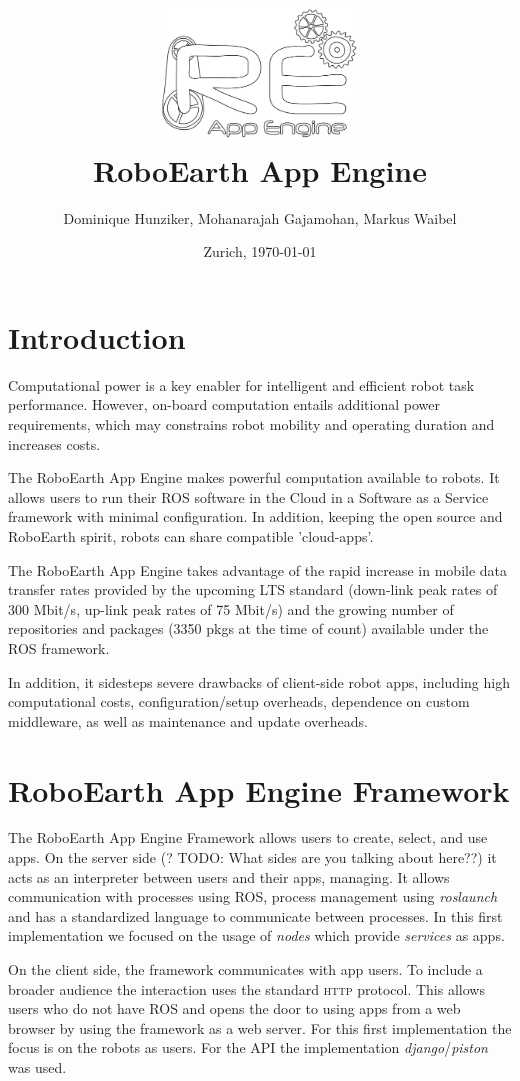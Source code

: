 \documentclass[10pt,a4paper]{article}
\title {\includegraphics[height=1.40in]{icon.pdf} \\RoboEarth App Engine }
\author {Dominique Hunziker, Mohanarajah Gajamohan, Markus Waibel}
\date{Zurich, \today}
\begin{document}
\maketitle
\section*{Introduction}

		Computational power is a key enabler for 
		intelligent and efficient robot task performance. However, on-board
		computation entails additional power requirements, which may constrains robot mobility and operating duration and increases costs.

The RoboEarth App Engine makes powerful computation available to robots. 
It allows users to run their ROS software in the Cloud in a Software as a Service framework with minimal configuration.
In addition,
		keeping the open source and RoboEarth spirit, robots can share compatible 'cloud-apps'.

The RoboEarth App Engine takes advantage of the rapid increase in mobile data transfer rates provided
		by the upcoming LTS standard (down-link peak rates of 300 Mbit/s,
		up-link peak rates of 75 Mbit/s) and the growing number of
		repositories and packages (3350 pkgs at the time of count) available
		under the ROS framework. 
				
In addition, it sidesteps severe drawbacks of client-side robot apps, including high computational costs, 
configuration/setup overheads, dependence on custom middleware, as well as maintenance and update overheads. 
		
	
	\section*{RoboEarth App Engine Framework}
		The RoboEarth App Engine Framework allows users to create, select, and use apps.
		On the server side (? TODO: What sides are you talking about here??) it acts as an interpreter between users and their apps, managing. It allows 
communication with processes using \textsc{ROS}, process management
		using \emph{roslaunch} and has a standardized language to communicate between
		processes. In this first implementation we focused on the usage of \emph{nodes} which provide
		\emph{services} as apps.
		
		On the client side, the framework communicates with app users. 
To include a broader audience the interaction uses the standard \textsc{http} protocol.
		This allows users who do not have \textsc{ROS} and opens the door to using apps from
		a web browser by using the framework as a web server. For this first
		implementation the focus is on the robots as users. For the API 
		the implementation \emph{django}/\emph{piston} was used.
	
\end{document}
